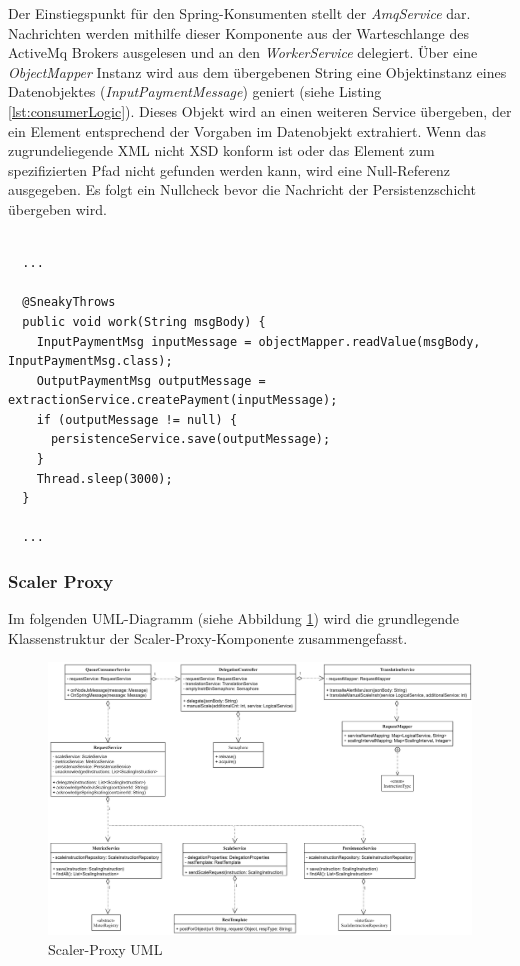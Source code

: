 Der Einstiegspunkt für den Spring-Konsumenten stellt der \emph{AmqService} dar. Nachrichten werden mithilfe dieser Komponente aus der Warteschlange des ActiveMq Brokers ausgelesen und an den \emph{WorkerService} delegiert. Über eine \emph{ObjectMapper} Instanz wird aus dem übergebenen String eine Objektinstanz eines Datenobjektes (\emph{InputPaymentMessage}) geniert (siehe Listing \ref{lst:consumerLogic}). Dieses Objekt wird an einen weiteren Service übergeben, der ein Element entsprechend der Vorgaben im Datenobjekt extrahiert. Wenn das zugrundeliegende XML nicht XSD konform ist oder das Element zum spezifizierten Pfad nicht gefunden werden kann, wird eine Null-Referenz ausgegeben. Es folgt ein Nullcheck bevor die Nachricht der Persistenzschicht übergeben wird.

\begin{minipage}{\linewidth}
\begin{lstlisting}[style=javaStyle,caption={WorkerService - Konsumer Logik},label=lst:consumerLogic]

  ...

  @SneakyThrows
  public void work(String msgBody) {
    InputPaymentMsg inputMessage = objectMapper.readValue(msgBody, InputPaymentMsg.class);
    OutputPaymentMsg outputMessage = extractionService.createPayment(inputMessage);
    if (outputMessage != null) {
      persistenceService.save(outputMessage);
    }
    Thread.sleep(3000);
  }

  ...

\end{lstlisting}
\end{minipage}


\subsubsection{Scaler Proxy}

Im folgenden UML-Diagramm (siehe Abbildung \ref{fig:proxyScalerUml}) wird die grundlegende Klassenstruktur der Scaler-Proxy-Komponente zusammengefasst. 

\begin{figure}[ht!]
	\centering
	\includegraphics[width=\linewidth]{kapitel/problemloesung/implementierung/_img/scaler-proxy-uml}
	\caption[Scaler-Proxy UML]{Scaler-Proxy UML}
	\label{fig:proxyScalerUml}
\end{figure}


